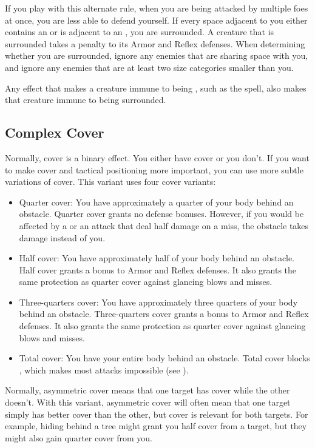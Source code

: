     If you play with this alternate rule, when you are being attacked by multiple foes at once, you are less able to defend yourself.
    If every space adjacent to you either contains an  or is adjacent to an , you are surrounded.
    A creature that is surrounded takes a  penalty to its Armor and Reflex defenses.
    When determining whether you are surrounded, ignore any enemies that are sharing space with you, and ignore any enemies that are at least two size categories smaller than you.

    Any effect that makes a creature immune to being \partiallyunaware, such as the  spell, also makes that creature immune to being surrounded.

  \subsection{Complex Cover}
    Normally, cover is a binary effect.
    You either have cover or you don't.
    If you want to make cover and tactical positioning more important, you can use more subtle variations of cover.
    This variant uses four cover variants:
    \begin{itemize}
      \item Quarter cover: You have approximately a quarter of your body behind an obstacle.
        Quarter cover grants no defense bonuses.
        However, if you would be affected by a  or an attack that deal half damage on a miss, the obstacle takes damage instead of you.
      \item Half cover: You have approximately half of your body behind an obstacle.
        Half cover grants a  bonus to Armor and Reflex defenses.
        It also grants the same protection as quarter cover against glancing blows and misses.
      \item Three-quarters cover: You have approximately three quarters of your body behind an obstacle.
        Three-quarters cover grants a  bonus to Armor and Reflex defenses.
        It also grants the same protection as quarter cover against glancing blows and misses.
      \item Total cover: You have your entire body behind an obstacle.
        Total cover blocks , which makes most attacks impossible (see ).
    \end{itemize}

    Normally, asymmetric cover means that one target has cover while the other doesn't.
    With this variant, asymmetric cover will often mean that one target simply has better cover than the other, but cover is relevant for both targets.
    For example, hiding behind a tree might grant you half cover from a target, but they might also gain quarter cover from you.

